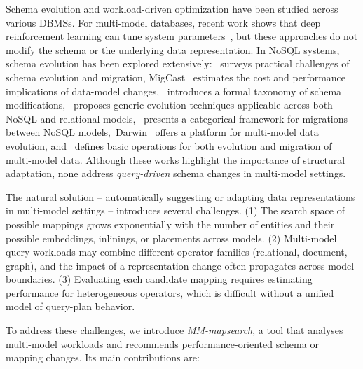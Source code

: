 Schema evolution and workload-driven optimization have been studied across various DBMSs. For multi-model databases, recent work shows that deep reinforcement learning can tune system parameters~\citep{10.1007/s10844-022-00762-0,10.1155/2023/8835111}, but these approaches do not modify the schema or the underlying data representation. In NoSQL systems, schema evolution has been explored extensively:~\citep{stoerl2020nosqlsurvey} surveys practical challenges of schema evolution and migration, 
MigCast~\citep{hillenbrand2019migcast} estimates the cost and performance implications of data-model changes,~\citep{chillon2022taxonomy} introduces a formal taxonomy of schema modifications,~\citep{10.1109/TKDE.2024.3362273} proposes generic evolution techniques applicable across both NoSQL and relational models,~\citep{gillet2025categorical} presents a categorical framework for migrations between NoSQL models,~Darwin~\citep{storl2022darwin} offers a platform for multi-model data evolution, and~\citep{rcis_2025} defines basic operations for both evolution and migration of multi-model data. Although these works highlight the importance of structural adaptation, none address \textit{query-driven} schema changes in multi-model settings. 

The natural solution -- automatically suggesting or adapting data representations in multi-model settings -- introduces several challenges. (1) The search space of possible mappings grows exponentially with the number of entities and their possible embeddings, inlinings, or placements across models. (2) Multi-model query workloads may combine different operator families (relational, document, graph), and the impact of a representation change often propagates across model boundaries. (3) Evaluating each candidate mapping requires estimating performance for heterogeneous operators, which is difficult without a unified model of query-plan behavior. 

To address these challenges, we introduce \textit{MM-mapsearch}, a tool that analyses multi-model workloads and recommends performance-oriented schema or mapping changes. Its main contributions are:

